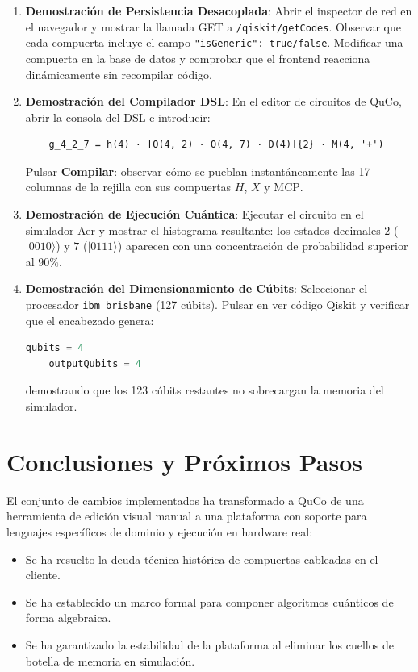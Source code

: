 \documentclass[11pt,a4paper]{article}
\begin{document}
\begin{enumerate}
    \item \textbf{Demostración de Persistencia Desacoplada}:
    Abrir el inspector de red en el navegador y mostrar la llamada GET a \texttt{/qiskit/getCodes}. Observar que cada compuerta incluye el campo \texttt{"isGeneric": true/false}. Modificar una compuerta en la base de datos y comprobar que el frontend reacciona dinámicamente sin recompilar código.
    
    \item \textbf{Demostración del Compilador DSL}:
    En el editor de circuitos de QuCo, abrir la consola del DSL e introducir:
    \begin{verbatim}
    g_4_2_7 = h(4) · [O(4, 2) · O(4, 7) · D(4)]{2} · M(4, '+')
    \end{verbatim}
    Pulsar \textbf{Compilar}: observar cómo se pueblan instantáneamente las 17 columnas de la rejilla con sus compuertas $H$, $X$ y $\text{MCP}$.
    
    \item \textbf{Demostración de Ejecución Cuántica}:
    Ejecutar el circuito en el simulador Aer y mostrar el histograma resultante: los estados decimales $2$ ($|0010\rangle$) y $7$ ($|0111\rangle$) aparecen con una concentración de probabilidad superior al $90\%$.
    
    \item \textbf{Demostración del Dimensionamiento de Cúbits}:
    Seleccionar el procesador \texttt{ibm\_brisbane} (127 cúbits). Pulsar en ver código Qiskit y verificar que el encabezado genera:
    \begin{lstlisting}[language=Python]
    qubits = 4
    outputQubits = 4
    \end{lstlisting}
    demostrando que los 123 cúbits restantes no sobrecargan la memoria del simulador.
\end{enumerate}

\section{Conclusiones y Próximos Pasos}

El conjunto de cambios implementados ha transformado a QuCo de una herramienta de edición visual manual a una plataforma con soporte para lenguajes específicos de dominio y ejecución en hardware real:
\begin{itemize}
    \item Se ha resuelto la deuda técnica histórica de compuertas cableadas en el cliente.
    \item Se ha establecido un marco formal para componer algoritmos cuánticos de forma algebraica.
    \item Se ha garantizado la estabilidad de la plataforma al eliminar los cuellos de botella de memoria en simulación.
\end{itemize}
\end{document}
